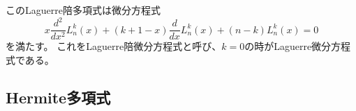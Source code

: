   このLaguerre陪多項式は微分方程式
  \begin{equation}
    x\dfrac{d^2}{dx^2}L_n^k(x) + (k+1-x)\dfrac{d}{dx}L_n^k(x) + (n-k)L_n^k(x) = 0
    \end{equation}
  を満たす。
  これをLaguerre陪微分方程式と呼び、$k = 0$の時がLaguerre微分方程式である。


  \subsection{Hermite多項式}
